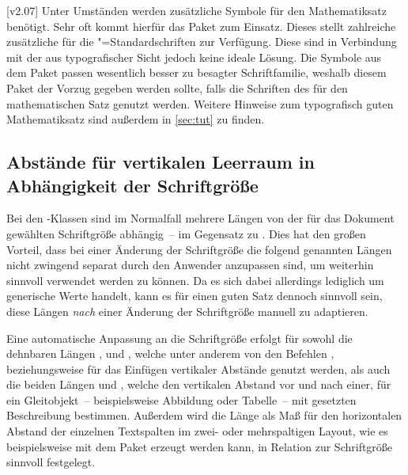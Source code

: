 \begin{DeclareEntity*}{}
\begin{DeclareEntity*}{}
\begin{DeclareEntity*}{}
%
[v2.07]%
Unter Umständen werden zusätzliche Symbole für den Mathematiksatz benötigt. 
Sehr oft kommt hierfür das Paket  zum Einsatz. Dieses stellt 
zahlreiche zusätzliche für die "=Standardschriften zur Verfügung. 
Diese sind in Verbindung mit der \OpenSans aus typografischer Sicht jedoch 
keine ideale Lösung. Die Symbole aus dem Paket  passen 
wesentlich besser zu besagter Schriftfamilie, weshalb diesem Paket der Vorzug 
gegeben werden sollte, falls die Schriften des \CDs für den mathematischen Satz 
genutzt werden. Weitere Hinweise zum typografisch guten Mathematiksatz sind 
außerdem in \autoref{sec:tut} zu finden.
%



\subsection{%
  Abstände für vertikalen Leerraum in Abhängigkeit der Schriftgröße%
}
%
%
Bei den \TUDScript-Klassen sind im Normalfall mehrere Längen von der für das 
Dokument gewählten Schriftgröße abhängig~-- im Gegensatz zu \KOMAScript. Dies 
hat den großen Vorteil, dass bei einer Änderung der Schriftgröße die folgend 
genannten Längen nicht zwingend separat durch den Anwender anzupassen sind, um 
weiterhin sinnvoll verwendet werden zu können. Da es sich dabei allerdings 
lediglich um generische Werte handelt, kann es für einen guten Satz dennoch 
sinnvoll sein, diese Längen \emph{nach} einer Änderung der Schriftgröße manuell 
zu adaptieren.

Eine automatische Anpassung an die Schriftgröße erfolgt für sowohl die 
dehnbaren Längen ,  und 
, welche unter anderem von den Befehlen 
,  beziehungsweise  für das 
Einfügen vertikaler Abstände genutzt werden, als auch die beiden Längen 
 und , welche den vertikalen 
Abstand vor und nach einer, für ein Gleitobjekt~-- beispielsweise Abbildung 
oder Tabelle~-- mit  gesetzten Beschreibung bestimmen. Außerdem 
wird die Länge  als Maß für den horizontalen Abstand der 
einzelnen Textspalten im zwei- oder mehrspaltigen Layout, wie es beispielsweise 
mit dem Paket  erzeugt werden kann, in Relation zur 
Schriftgröße sinnvoll festgelegt.


\end{DeclareEntity*}
\end{DeclareEntity*}
\end{DeclareEntity*}
